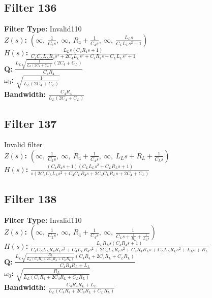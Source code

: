 \documentclass{article}
\begin{document}
\subsection*{Filter 136}
\textbf{Filter Type:} Invalid110 \\ 
\textbf{$Z(s)$:} $\left( \infty, \  \frac{1}{C_{2} s}, \  \infty, \  R_{4} + \frac{1}{C_{4} s}, \  \infty, \  \frac{L_{L} s}{C_{L} L_{L} s^{2} + 1}\right)$ \\ 
\textbf{$H(s)$:} $\frac{L_{L} s \left(C_{4} R_{4} s + 1\right)}{C_{4} C_{L} L_{L} R_{4} s^{3} + 2 C_{4} L_{L} s^{2} + C_{4} R_{4} s + C_{L} L_{L} s^{2} + 1}$ \\ 
\textbf{Q:} $\frac{L_{L} \sqrt{\frac{1}{L_{L} \left(2 C_{4} + C_{L}\right)}} \left(2 C_{4} + C_{L}\right)}{C_{4} R_{4}}$ \\ 
\textbf{$\omega_0$:} $\sqrt{\frac{1}{L_{L} \left(2 C_{4} + C_{L}\right)}}$ \\ 
\textbf{Bandwidth:} $\frac{C_{4} R_{4}}{L_{L} \left(2 C_{4} + C_{L}\right)}$ \\ 
\subsection*{Filter 137}
Invalid filter \\ 
\textbf{$Z(s)$:} $\left( \infty, \  \frac{1}{C_{2} s}, \  \infty, \  R_{4} + \frac{1}{C_{4} s}, \  \infty, \  L_{L} s + R_{L} + \frac{1}{C_{L} s}\right)$ \\ 
\textbf{$H(s)$:} $\frac{\left(C_{4} R_{4} s + 1\right) \left(C_{L} L_{L} s^{2} + C_{L} R_{L} s + 1\right)}{s \left(2 C_{4} C_{L} L_{L} s^{2} + C_{4} C_{L} R_{4} s + 2 C_{4} C_{L} R_{L} s + 2 C_{4} + C_{L}\right)}$ \\ 
\subsection*{Filter 138}
\textbf{Filter Type:} Invalid110 \\ 
\textbf{$Z(s)$:} $\left( \infty, \  \frac{1}{C_{2} s}, \  \infty, \  R_{4} + \frac{1}{C_{4} s}, \  \infty, \  \frac{1}{C_{L} s + \frac{1}{R_{L}} + \frac{1}{L_{L} s}}\right)$ \\ 
\textbf{$H(s)$:} $\frac{L_{L} R_{L} s \left(C_{4} R_{4} s + 1\right)}{C_{4} C_{L} L_{L} R_{4} R_{L} s^{3} + C_{4} L_{L} R_{4} s^{2} + 2 C_{4} L_{L} R_{L} s^{2} + C_{4} R_{4} R_{L} s + C_{L} L_{L} R_{L} s^{2} + L_{L} s + R_{L}}$ \\ 
\textbf{Q:} $\frac{L_{L} \sqrt{\frac{R_{L}}{L_{L} \left(C_{4} R_{4} + 2 C_{4} R_{L} + C_{L} R_{L}\right)}} \left(C_{4} R_{4} + 2 C_{4} R_{L} + C_{L} R_{L}\right)}{C_{4} R_{4} R_{L} + L_{L}}$ \\ 
\textbf{$\omega_0$:} $\sqrt{\frac{R_{L}}{L_{L} \left(C_{4} R_{4} + 2 C_{4} R_{L} + C_{L} R_{L}\right)}}$ \\ 
\textbf{Bandwidth:} $\frac{C_{4} R_{4} R_{L} + L_{L}}{L_{L} \left(C_{4} R_{4} + 2 C_{4} R_{L} + C_{L} R_{L}\right)}$ \\ 
\end{document}
